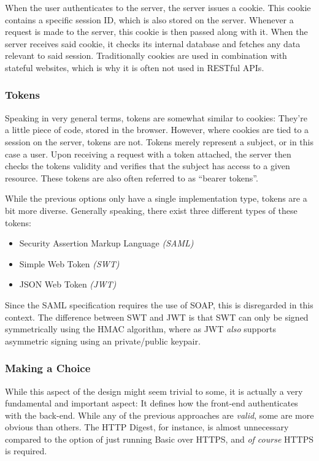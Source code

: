 				When the user authenticates to the server, the server issues a cookie. This cookie contains a specific session ID, which is also stored on the server. Whenever a request is made to the server, this cookie is then passed along with it. When the server receives said cookie, it checks its internal database and fetches any data relevant to said session. Traditionally cookies are used in combination with stateful websites, which is why it is often not used in RESTful APIs.

			\subsubsection{Tokens}
				Speaking in very general terms, tokens are somewhat similar to cookies: They're a little piece of code, stored in the browser. However, where cookies are tied to a session on the server, tokens are not. Tokens merely represent a subject, or in this case a user. Upon receiving a request with a token attached, the server then checks the tokens validity and verifies that the subject has access to a given resource. These tokens are also often referred to as ``bearer tokens''.

				While the previous options only have a single implementation type, tokens are a bit more diverse. Generally speaking, there exist three different types of these tokens:
				\begin{itemize}
					\item Security Assertion Markup Language \emph{(SAML)}
					\item Simple Web Token \emph{(SWT)}
					\item JSON Web Token \emph{(JWT)}
				\end{itemize}
				Since the SAML specification requires the use of SOAP, this is disregarded in this context. The difference between SWT and JWT is that SWT can only be signed symmetrically using the HMAC algorithm, where as JWT \emph{also} supports asymmetric signing using an private/public keypair\cite{auth0_jwt}.

			\subsubsection{Making a Choice}
				\label{sec:design:jwt}
				While this aspect of the design might seem trivial to some, it is actually a very fundamental and important aspect: It defines how the front-end authenticates with the back-end. While any of the previous approaches are \emph{valid}, some are more obvious than others. The HTTP Digest, for instance, is almost unnecessary compared to the option of just running Basic over HTTPS, and \emph{of course} HTTPS is required.

